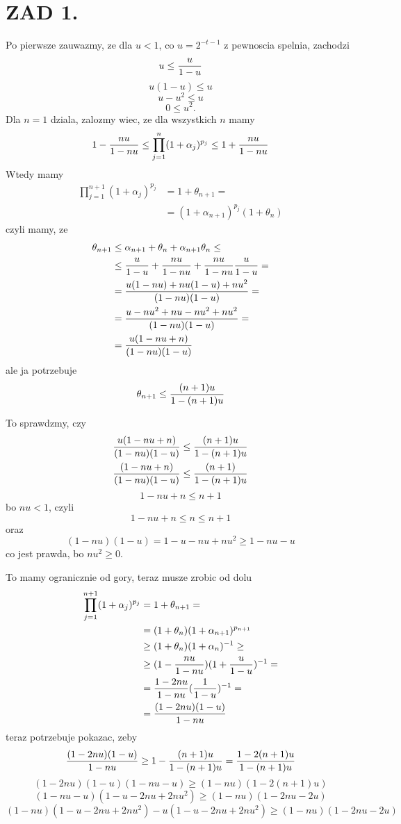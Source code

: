 \documentclass{article}[13pt]
\begin{document}
    \section*{ZAD 1.}
    Po pierwsze zauwazmy, ze dla $u<1$, co $u=2^{-t-1}$ z pewnoscia spelnia, zachodzi
    $$u\leq {u\over 1-u}$$
    $$u(1-u)\leq u$$
    $$u-u^2\leq u$$
    $$0\leq u^2.$$
    Dla $n=1$ dziala, zalozmy wiec, ze dla wszystkich $n$ mamy
    $$1-{nu\over 1-nu}\leq\prod\limits_{j=1}^n(1+\alpha_j)^{p_j}\leq 1+{nu\over 1-nu}$$
    Wtedy mamy
    \begin{align*}
        \prod\limits_{j=1}^{n+1}(1+\alpha_j)^{p_j}&=1+\theta_{n+1}=\\
        &=(1+\alpha_{n+1})^{p_j}(1+\theta_n)
    \end{align*}
    czyli mamy, ze 
    \begin{align*}
        \theta_{n+1}&\leq\alpha_{n+1}+\theta_n+\alpha_{n+1}\theta_n\leq\\
        &\leq {u\over 1-u}+{nu\over 1-nu}+{nu\over1-nu}{u\over 1-u}=\\
        &={u(1-nu)+nu(1-u)+nu^2\over (1-nu)(1-u)}=\\
        &={u-nu^2+nu-nu^2+nu^2\over (1-nu)(1-u)}=\\
        &={u(1-nu+n)\over (1-nu)(1-u)}
    \end{align*}
    ale ja potrzebuje
    $$\theta_{n+1}\leq {(n+1)u\over 1-(n+1)u}$$

    To sprawdzmy, czy
    \begin{align*}
        {u(1-nu+n)\over (1-nu)(1-u)}&\leq{(n+1)u\over 1-(n+1)u}\\
        {(1-nu+n)\over (1-nu)(1-u)}&\leq{(n+1)\over 1-(n+1)u}\\
    \end{align*}
    $$1-nu+n\leq n+1$$
    bo $nu<1$, czyli
    $$1-nu+n\leq n\leq n+1$$
    oraz
    $$(1-nu)(1-u)=1-u-nu+nu^2\geq 1-nu-u$$
    co jest prawda, bo $nu^2\geq 0$.
    \medskip

    To mamy ogranicznie od gory, teraz musze zrobic od dolu
    \begin{align*}
        \prod\limits_{j=1}^{n+1}(1+\alpha_j)^{p_j}&=1+\theta_{n+1}=\\
        &=(1+\theta_n)(1+\alpha_{n+1})^{p_{n+1}}\\
        &\geq(1+\theta_n)(1+\alpha_{n})^{-1}\geq\\
        &\geq(1-{nu\over 1-nu})(1+{u\over 1-u})^{-1}=\\
        &={1-2nu\over 1-nu}({1\over 1-u})^{-1}=\\
        &={(1-2nu)(1-u)\over 1-nu}
    \end{align*}
    teraz potrzebuje pokazac, zeby
    $${(1-2nu)(1-u)\over 1-nu}\geq 1-{(n+1)u\over{1-(n+1)u}}={1-2(n+1)u\over 1-(n+1)u}$$
    $$(1-2nu)(1-u)(1-nu-u)\geq (1-nu)(1-2(n+1)u)$$
    $$(1-nu-u)(1-u-2nu+2nu^2)\geq (1-nu)(1-2nu-2u)$$
    $$(1-nu)(1-u-2nu+2nu^2)-u(1-u-2nu+2nu^2)\geq(1-nu)(1-2nu-2u)$$
    
\end{document}
